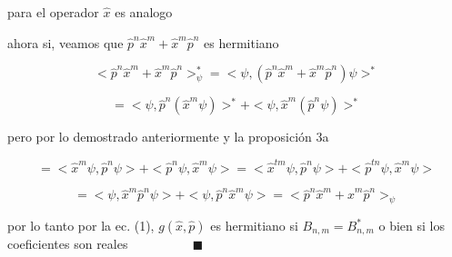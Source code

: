 \documentclass[12pt,a4paper]{article}
\begin{document}
\begin{enumerate}
    para el operador $\hat{x}$ es analogo
    
    ahora si, veamos que $\hat{p}^{n}\hat{x}^{m}+ \hat{x}^{m}\hat{p}^{n}$ es hermitiano
    
    \begin{equation*}
        <\hat{p}^{n}\hat{x}^{m}+ \hat{x}^{m}\hat{p}^{n}>_{\psi}^* = <\psi,(\hat{p}^{n}\hat{x}^{m}+ \hat{x}^{m}\hat{p}^{n})\psi>^*
    \end{equation*}
    
    \begin{equation*}
        = <\psi,\hat{p}^{n}(\hat{x}^{m} \psi)>^* + <\psi, \hat{x}^{m}(\hat{p}^{n}\psi)>^*
    \end{equation*}
    
    pero por lo demostrado anteriormente y la proposición 3a
    
    \begin{equation*}
        = <\hat{x}^{m} \psi,\hat{p}^{n} \psi> + <\hat{p}^{n}\psi, \hat{x}^{m} \psi> = <\hat{x}^{tm}  \psi,\hat{p}^{n} \psi> + <\hat{p}^{tn} \psi, \hat{x}^{m} \psi>
    \end{equation*}
    
    \begin{equation*}
        = < \psi,\hat{x}^{m} \hat{p}^{n} \psi> + <\psi, \hat{p}^{n} \hat{x}^{m} \psi> =  <\hat{p}^{n}\hat{x}^{m}+ \hat{x}^{m}\hat{p}^{n}>_{\psi}
    \end{equation*}
    
    por lo tanto por la ec. (1), $g(\hat{x}, \hat{p})$ es hermitiano si $B_{n,m} = B_{n,m}^{*} $ o bien si los coeficientes son reales $\hspace{2cm} \blacksquare$
    

\end{enumerate}
\end{document}
